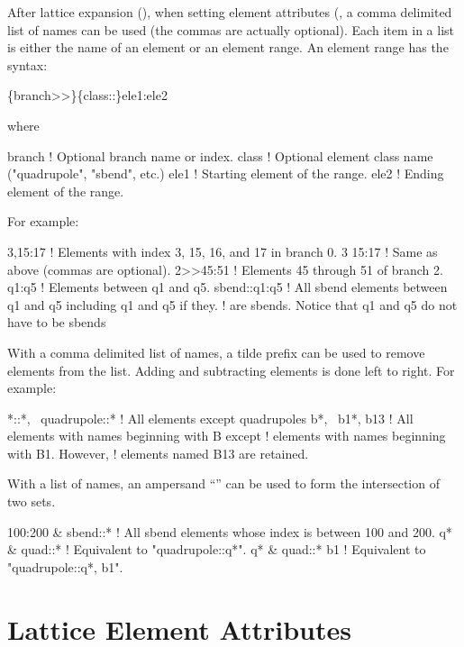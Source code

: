 {{{{{After lattice expansion (), when setting element attributes (, a
comma delimited list of names can be used (the commas are actually optional). Each item in a list is
either the name of an element or an element range. An element range has the syntax:
\begin{example}
  \{branch>>\}\{class::\}ele1:ele2
\end{example}
where
\begin{example}
  branch   ! Optional branch name or index.
  class    ! Optional element class name ("quadrupole", "sbend", etc.)
  ele1     ! Starting element of the range.
  ele2     ! Ending element of the range. 
\end{example}
For example:
\begin{example}
  3,15:17          ! Elements with index 3, 15, 16, and 17 in branch 0.
  3 15:17          ! Same as above (commas are optional).
  2>>45:51         ! Elements 45 through 51 of branch 2.
  q1:q5            ! Elements between q1 and q5.
  sbend::q1:q5     ! All sbend elements between q1 and q5 including q1 and q5 if they. 
                   ! are sbends. Notice that q1 and q5 do not have to be sbends
\end{example}

With a comma delimited list of names, a tilde prefix can be used to remove elements from the list.
Adding and subtracting elements is done left to right. For example:
\begin{example}
  *::*, ~quadrupole::*  ! All elements except quadrupoles
  b*, ~b1*, b13         ! All elements with names beginning with B except
                        !   elements with names beginning with B1. However,
                        !   elements named B13 are retained.
\end{example}

With a list of names, an ampersand ``\vn{\&}'' can be used to form the intersection of two sets.
\begin{example}
  100:200 \& sbend::*    ! All sbend elements whose index is between 100 and 200.
  q* \& quad::*          ! Equivalent to "quadrupole::q*".
  q* \& quad::* b1       ! Equivalent to "quadrupole::q*, b1".
\end{example}

\section{Lattice Element Attributes}
\label{s:lat.attribs}

}}}}}
